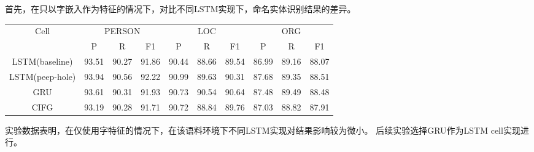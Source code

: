 首先，在只以字嵌入作为特征的情况下，对比不同LSTM实现下，命名实体识别结果的差异。
\begin{table}[H]
    \centering
    \small
    \begin{tabular}{cccccccccc}
        \toprule
            \multirow{2}{*}{Cell} &\multicolumn{3}{c}{PERSON} &\multicolumn{3}{c}{LOC} &\multicolumn{3}{c}{ORG}\\
            \cmidrule(lr){2-4} \cmidrule(lr){5-7} \cmidrule(lr){8-10}
            & P & R & F1 & P & R & F1 & P & R & F1\\
        \midrule
        LSTM(baseline) & 93.51 & 90.27 & 91.86 & 90.44 & 88.66 & 89.54 & 86.99 & 89.16 & 88.07\\
        LSTM(peep-hole) & 93.94 & 90.56 & 92.22 & 90.99 & 89.63 & 90.31 & 87.68 & 89.35 & 88.51\\
        GRU & 93.61 & 90.31 & 91.93 & 90.73 & 90.54 & 90.64 & 87.48 & 89.49 & 88.48\\
        CIFG  & 93.19 & 90.28 & 91.71 & 90.72 & 88.84 & 89.76 & 87.03 & 88.82 & 87.91\\
        \bottomrule
    \end{tabular}
    \label{tab:lstm_cell_comparison}
\end{table}

实验数据表明，在仅使用字特征的情况下，在该语料环境下不同LSTM实现对结果影响较为微小。
后续实验选择GRU作为LSTM cell实现进行。

